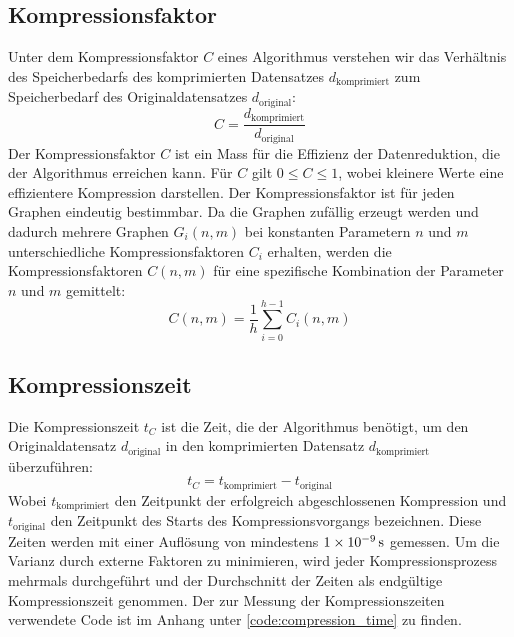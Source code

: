 \documentclass{ffhsthesis}
\begin{document}
\subsection{Kompressionsfaktor}
Unter dem Kompressionsfaktor $C$ eines Algorithmus verstehen wir das Verhältnis des Speicherbedarfs des komprimierten Datensatzes $d_{\text{komprimiert}}$ zum Speicherbedarf des Originaldatensatzes  $d_{\text{original}}$:
\begin{equation}
    C = \frac{d_{\text{komprimiert}}}{d_{\text{original}}}
\end{equation}
Der Kompressionsfaktor $C$ ist ein Mass für die Effizienz der Datenreduktion, die der Algorithmus erreichen kann. Für $C$ gilt $0 \leq C \leq 1$, wobei kleinere Werte eine effizientere Kompression darstellen. Der Kompressionsfaktor ist für jeden Graphen eindeutig bestimmbar. Da die Graphen zufällig erzeugt werden und dadurch mehrere Graphen $G_{i}(n,m)$ bei konstanten Parametern $n$ und $m$ unterschiedliche Kompressionsfaktoren $C_{i}$ erhalten, werden die Kompressionsfaktoren $C(n,m)$ für eine spezifische Kombination der Parameter $n$ und $m$ gemittelt:
\begin{equation}
    C(n,m) = \frac{1}{h} \sum_{i=0}^{h-1} C_{i}(n,m)
\end{equation}

\subsection{Kompressionszeit}
Die Kompressionszeit $t_{C}$ ist die Zeit, die der Algorithmus benötigt, um den Originaldatensatz $d_{\text{original}}$ in den komprimierten Datensatz $d_{\text{komprimiert}}$ überzuführen:
\begin{equation}
    t_{C} = t_{\text{komprimiert}} - t_{\text{original}}
\end{equation}
Wobei $t_{\text{komprimiert}}$ den Zeitpunkt der erfolgreich abgeschlossenen Kompression und $t_{\text{original}}$ den Zeitpunkt des Starts des Kompressionsvorgangs bezeichnen.
Diese Zeiten werden mit einer Auflösung von mindestens $\SI{1E-9}{\second}$ gemessen. Um die Varianz durch externe Faktoren zu minimieren, wird jeder Kompressionsprozess mehrmals durchgeführt und der Durchschnitt der Zeiten als endgültige Kompressionszeit genommen. Der zur Messung der Kompressionszeiten verwendete Code ist im Anhang unter \ref{code:compression_time} zu finden. 
\end{document}
